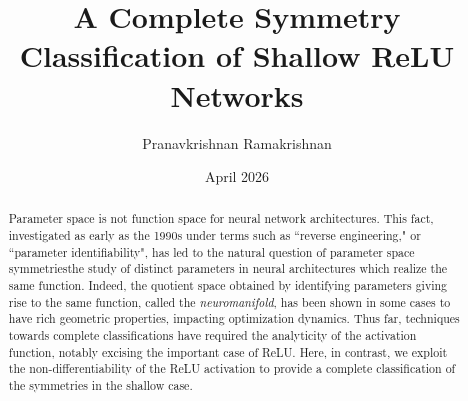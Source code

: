 \documentclass[11pt,letterpaper]{amsart}
\title{A Complete Symmetry Classification of Shallow ReLU Networks}
\author{Pranavkrishnan Ramakrishnan}
\date{April 2026}
\begin{document}
\maketitle

\newcommand{\Null}{\textup{Null }}
\newcommand{\Leftnull}{\textup{Leftnull }}
\newcommand{\Col}{\textup{Col }}
\newcommand{\Row}{\textup{Row }}
\newcommand{\rank}{\textup{rank }}
\newcommand{\im}{\textup{im }}
\newcommand{\Span}{\textup{Span }}

\newcommand{\GL}{\textup{GL}}
\newcommand{\Cl}{\textup{Cl}}
\newcommand{\Stab}{\textup{Stab}}
\newcommand{\Fix}{\textup{Fix}}
\newcommand{\id}{\textup{id}}
\newcommand{\Orb}{\textup{Orb}}
\newcommand{\Inn}{\textup{Inn}}
\newcommand{\Aut}{\textup{Aut}}
\newcommand{\lcm}{\textup{lcm}}
\newcommand{\Syl}{\textup{Syl}}
\newcommand{\Hom}{\textup{Hom}}
\newcommand{\Sym}{\textup{Sym}}
\newcommand{\comb}[2]{\begin{pmatrix} #1 \\ #2 \end{pmatrix}}
\newcommand{\vtr}[2]{(\begin{smallmatrix} #1 \\ #2 \end{smallmatrix})}
\newcommand{\Vtr}[2]{\begin{bmatrix} #1 \\ #2 \end{bmatrix}}
\newcommand{\tor}{\textup{tor}}
\newcommand{\block}[1]{
  \underbrace{0 \; \cdots\; 0}_{#1}
}
\newcommand{\Gal}{\textup{Gal}}
\newcommand{\paramspace}[2]{\Omega_{(#1, \ldots, #2)}}
\newcommand{\diaggroup}[2]{\mathcal{H}_{(#1, \ldots, #2)}}
\newcommand{\realizationmap}[2]{\rho_{(#1, \ldots, #2)}}


\newtheorem{theorem}{Theorem}
\newtheorem{lemma}{Lemma}
\newtheorem{corollary}[lemma]{Corollary}
\newtheorem{proposition}[lemma]{Proposition}
\newtheorem{defin}{Definition}
\newtheorem{example}{Example}
\newtheorem{definlem}[defin]{Definition-Lemma}
\newtheorem{remark}{Remark}
\begin{abstract}
    Parameter space is not function space for neural network architectures. This fact, investigated as early as the 1990s under terms such as ``reverse engineering," or ``parameter identifiability", has led to the natural question of parameter space symmetries\textemdash the study of distinct parameters in neural architectures which realize the same function. Indeed, the quotient space obtained by identifying parameters giving rise to the same function, called the \textit{neuromanifold}, has been shown in some cases to have rich geometric properties, impacting optimization dynamics. Thus far, techniques towards complete classifications have required the analyticity of the activation function, notably excising the important case of ReLU. Here, in contrast, we exploit the non-differentiability of the ReLU activation to provide a complete classification of the symmetries in the shallow case.
\end{abstract}
\end{document}
